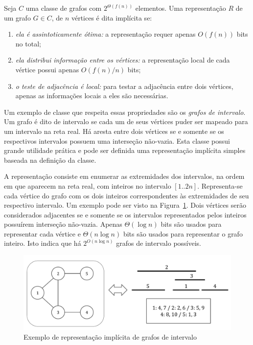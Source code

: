 Seja $C$ uma classe de grafos com $2^{\Theta(f(n))}$ elementos. Uma representação $R$ de um grafo $G \in C$, de $n$ vértices é dita implícita se:
\begin{enumerate}  
\item \emph{ela é assintoticamente ótima:} a representação requer apenas $O(f(n))$ bits no total;
\item \emph{ela distribui informação entre os vértices:} a representação local de cada vértice possui apenas $O(f(n)/n)$ bits;
\item \emph{o teste de adjacência é local:} para testar a adjacência entre dois vértices, apenas as informações locais a eles são necessárias.
\end{enumerate}

Um exemplo de classe que respeita essas propriedades são os \emph{grafos de intervalo}. Um grafo é dito de intervalo se cada um de seus vértices puder ser mapeado para um intervalo na reta real. Há aresta entre dois vértices se e somente se os respectivos intervalos possuem uma interseção não-vazia. Esta classe possui grande utilidade prática e pode ser definida uma representação implícita simples baseada na definição da classe. 

A representação consiste em enumerar as extremidades dos intervalos, na ordem em que aparecem na reta real, com inteiros no intervalo $[1..2n]$. Representa-se cada vértice do grafo com os dois inteiros correspondentes às extremidades de seu respectivo intervalo. Um exemplo pode ser visto na Figura~\ref{fig:graphs2}. Dois vértices serão considerados adjacentes se e somente se os intervalos representados pelos inteiros possuírem interseção não-vazia. Apenas $\Theta(\log n)$ bits são usados para representar cada vértice e $\Theta(n\log n)$ bits são usados para representar o grafo inteiro. Isto indica que há $2^{O(n \log n)}$ grafos de intervalo possíveis.

\begin{figure}[!htbp]
  \centering
  \includegraphics[scale=0.6]{files/graphs2.pdf}
  \caption{Exemplo de representação implícita de grafos de intervalo}
  \label{fig:graphs2}
\end{figure}


